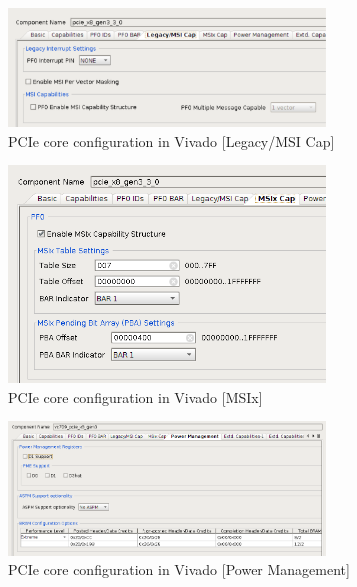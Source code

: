 \begin{figure}[H]
\centering
\includegraphics[width=0.75\textwidth]{pictures/pcie_core_config5.pdf}
\caption{PCIe core configuration in Vivado [Legacy/MSI Cap]}
\label{fig:pcie_core_config5}
\end{figure}

\begin{figure}[H]
\centering
\includegraphics[width=0.75\textwidth]{pictures/pcie_core_msix.png}
\caption{PCIe core configuration in Vivado [MSIx]}
\label{fig:pcie_core_config6}
\end{figure}
\newpage

\begin{figure}[H]
\centering
\includegraphics[width=0.75\textwidth]{pictures/pcie_core_pwr.png}
\caption{PCIe core configuration in Vivado [Power Management]}
\label{fig:pcie_core_config7}
\end{figure}

